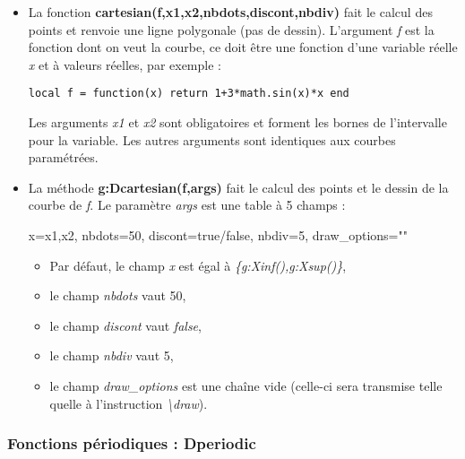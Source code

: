 \begin{itemize}
\item La fonction \textbf{cartesian(f,x1,x2,nbdots,discont,nbdiv)} fait le calcul des points et renvoie une ligne polygonale (pas de dessin). L'argument \emph{f} est la fonction dont on veut la courbe, ce doit être une fonction d'une variable réelle \emph{x} et à valeurs réelles, par exemple :

    \texttt{local f = function(x) return 1+3*math.sin(x)*x end}

    Les arguments \emph{x1} et \emph{x2} sont obligatoires et forment les bornes de l'intervalle pour la variable. Les autres arguments sont identiques aux courbes paramétrées.

\item La méthode \textbf{g:Dcartesian(f,args)} fait le calcul des points et le dessin de la courbe de \emph{f}. Le paramètre \emph{args} est une table à 5 champs :

\begin{TeXcode}
  { x={x1,x2}, nbdots=50, discont=true/false, nbdiv=5, draw_options="" }
\end{TeXcode}
  
  \begin{itemize}
      \item   Par défaut, le champ \emph{x} est égal à \emph{\{g:Xinf(),g:Xsup()\}}, 
      \item le champ \emph{nbdots} vaut 50, 
      \item le champ \emph{discont} vaut \emph{false}, 
      \item le champ \emph{nbdiv} vaut 5, 
      \item le champ \emph{draw\_options} est une chaîne vide (celle-ci sera transmise telle quelle à l'instruction \emph{\textbackslash draw}).
  \end{itemize}
\end{itemize}

\subsubsection{Fonctions périodiques : Dperiodic}

